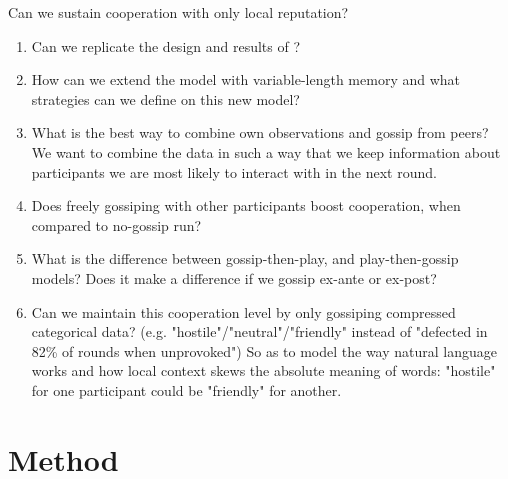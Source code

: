 \documentclass[english]{article}
\begin{document}
Can we sustain cooperation with only local reputation?
\begin{enumerate}
  \item Can we replicate the design and results of \citet{smaldino}?
  \item How can we extend the model with variable-length memory and what strategies can we define on this new model?
  \item What is the best way to combine own observations and gossip from peers? We want to combine the data in such a way that we keep information about participants we are most likely to interact with in the next round.
  \item Does freely gossiping with other participants boost cooperation, when compared to no-gossip run?
  \item What is the difference between gossip-then-play, and play-then-gossip models? Does it make a difference if we gossip ex-ante or ex-post?
  \item Can we maintain this cooperation level by only gossiping compressed categorical data? (e.g. "hostile"/"neutral"/"friendly" instead of "defected in 82\% of rounds when unprovoked") So as to model the way natural language works and how local context skews the absolute meaning of words: "hostile" for one participant could be "friendly" for another.
\end{enumerate}



\section*{Method}
\end{document}
